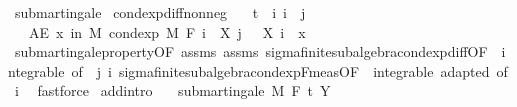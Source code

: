 \begin{isabellebody}
\endisatagproof
{\isafoldproof}%
%
\isadelimproof
%
\endisadelimproof
%
\isadelimdocument
%
\endisadelimdocument
%
\isatagdocument
%
\isamarkuptrue%
%
\endisatagdocument
{\isafolddocument}%
%
\isadelimdocument
%
\endisadelimdocument
{}\isamarkupfalse%
\ submartingale\isanewline
{}\isanewline
\isanewline
{}\isamarkupfalse%
\ cond{\isacharunderscore}{\kern0pt}exp{\isacharunderscore}{\kern0pt}diff{\isacharunderscore}{\kern0pt}nonneg{\isacharcolon}{\kern0pt}\isanewline
\ \ \ {\isachardoublequoteopen}t\ {\isasymle}\ i{\isachardoublequoteclose}\ {\isachardoublequoteopen}i\ {\isasymle}\ j{\isachardoublequoteclose}\isanewline
\ \ \ {\isachardoublequoteopen}AE\ x\ in\ M{\isachardot}{\kern0pt}\ cond{\isacharunderscore}{\kern0pt}exp\ M\ {\isacharparenleft}{\kern0pt}F\ i{\isacharparenright}{\kern0pt}\ {\isacharparenleft}{\kern0pt}{\isasymlambda}{\isasymxi}{\isachardot}{\kern0pt}\ X\ j\ {\isasymxi}\ {\isacharminus}{\kern0pt}\ X\ i\ {\isasymxi}{\isacharparenright}{\kern0pt}\ x\ {\isasymge}\ {}{\isachardoublequoteclose}\isanewline
%
\isadelimproof
\ \ %
\endisadelimproof
%
\isatagproof
{}\isamarkupfalse%
\ submartingale{\isacharunderscore}{\kern0pt}property{\isacharbrackleft}{\kern0pt}OF\ assms{\isacharbrackright}{\kern0pt}\ assms\ sigma{\isacharunderscore}{\kern0pt}finite{\isacharunderscore}{\kern0pt}subalgebra{\isachardot}{\kern0pt}cond{\isacharunderscore}{\kern0pt}exp{\isacharunderscore}{\kern0pt}diff{\isacharbrackleft}{\kern0pt}OF\ {\isacharunderscore}{\kern0pt}\ integrable{\isacharparenleft}{\kern0pt}{}{\isacharcomma}{\kern0pt}{}{\isacharparenright}{\kern0pt}{\isacharcomma}{\kern0pt}\ of\ {\isacharunderscore}{\kern0pt}\ j\ i{\isacharbrackright}{\kern0pt}\ sigma{\isacharunderscore}{\kern0pt}finite{\isacharunderscore}{\kern0pt}subalgebra{\isachardot}{\kern0pt}cond{\isacharunderscore}{\kern0pt}exp{\isacharunderscore}{\kern0pt}F{\isacharunderscore}{\kern0pt}meas{\isacharbrackleft}{\kern0pt}OF\ {\isacharunderscore}{\kern0pt}\ integrable\ adapted{\isacharcomma}{\kern0pt}\ of\ i{\isacharbrackright}{\kern0pt}\ \isamarkupfalse%
\ fastforce%
\endisatagproof
{\isafoldproof}%
%
\isadelimproof
\isanewline
%
\endisadelimproof
\isanewline
{}\isamarkupfalse%
\ add{\isacharbrackleft}{\kern0pt}intro{\isacharbrackright}{\kern0pt}{\isacharcolon}{\kern0pt}\isanewline
\ \ \ {\isachardoublequoteopen}submartingale\ M\ F\ t\ Y{\isachardoublequoteclose}\isanewline

\end{isabellebody}
